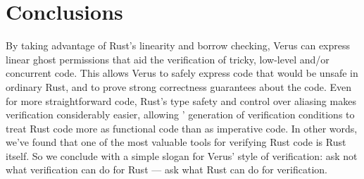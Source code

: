 
\section{Conclusions}\label{sec:conclusions}

By taking advantage of Rust's linearity and borrow checking,
Verus can express linear ghost permissions that aid the verification
of tricky, low-level and/or concurrent code.
This allows Verus to safely express code that would be unsafe in ordinary Rust,
and to prove strong correctness guarantees about the code.
Even for more straightforward code,
Rust's type safety and control over aliasing makes verification considerably easier,
allowing \verus' generation of verification conditions to treat Rust code more as functional code
than as imperative code.
In other words, we've found that one of the most valuable tools for verifying Rust code is Rust itself.
So we conclude with a simple slogan for Verus' style of verification:
ask not what verification can do for Rust --- ask what Rust can do for verification.
